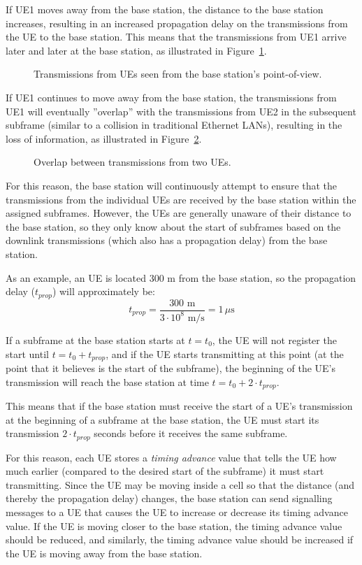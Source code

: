 If UE1 moves away from the base station, the distance to the base station increases, resulting in an increased propagation delay on the transmissions from the UE to the base station. This means that the transmissions from UE1 arrive later and later at the base station, as illustrated in Figure~\ref{fig:lte_ta2}.
\begin{figure}[htbp]
	\centering
	\caption{\label{fig:lte_ta2}Transmissions from UEs seen from the base station's point-of-view.}
\end{figure}

If UE1 continues to move away from the base station, the transmissions from UE1 will eventually ''overlap'' with the transmissions from UE2 in the subsequent subframe (similar to a collision in traditional Ethernet LANs), resulting in the loss of information, as illustrated in Figure~\ref{fig:lte_ta3}.
\begin{figure}[htbp]
	\centering
	\caption{\label{fig:lte_ta3}Overlap between transmissions from two UEs.}
\end{figure}

For this reason, the base station will continuously attempt to ensure that the transmissions from the individual UEs are received by the base station within the assigned subframes. However, the UEs are generally unaware of their distance to the base station, so they only know about the start of subframes based on the downlink transmissions (which also has a propagation delay) from the base station.

As an example, an UE is located 300 m from the base station, so the propagation delay ($t_{prop}$) will approximately be:
\[
t_{prop} = \frac{300\textrm{ m}}{3\cdot{}10^8\textrm{ m/s}} = 1\,\mu\textrm{s}
\]

If a subframe at the base station starts at $t = t_0$, the UE will not register the start until $t = t_0 + t_{prop}$, and if the UE starts transmitting at this point (\ie at the point that it believes is the start of the subframe), the beginning of the UE's transmission will reach the base station at time $t = t_0 + 2\cdot{}t_{prop}$.

This means that if the base station must receive the start of a UE's transmission at the beginning of a subframe at the base station, the UE must start its transmission $2\cdot{}t_{prop}$ seconds before it receives the same subframe.

For this reason, each UE stores a \emph{timing advance} value that tells the UE how much earlier (compared to the desired start of the subframe) it must start transmitting. Since the UE may be moving inside a cell so that the distance (and thereby the propagation delay) changes, the base station can send signalling messages to a UE that causes the UE to increase or decrease its timing advance value. If the UE is moving closer to the base station, the timing advance value should be reduced, and similarly, the timing advance value should be increased if the UE is moving away from the base station.

